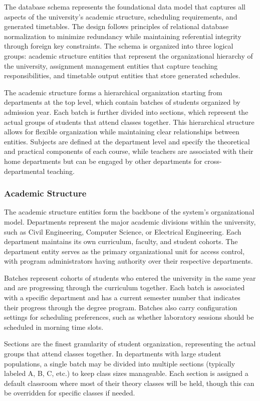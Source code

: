 \documentclass[12pt,a4paper]{article}
\begin{document}
The database schema represents the foundational data model that captures all aspects of the university's academic structure, scheduling requirements, and generated timetables. The design follows principles of relational database normalization to minimize redundancy while maintaining referential integrity through foreign key constraints. The schema is organized into three logical groups: academic structure entities that represent the organizational hierarchy of the university, assignment management entities that capture teaching responsibilities, and timetable output entities that store generated schedules.

The academic structure forms a hierarchical organization starting from departments at the top level, which contain batches of students organized by admission year. Each batch is further divided into sections, which represent the actual groups of students that attend classes together. This hierarchical structure allows for flexible organization while maintaining clear relationships between entities. Subjects are defined at the department level and specify the theoretical and practical components of each course, while teachers are associated with their home departments but can be engaged by other departments for cross-departmental teaching.

\subsubsection{Academic Structure}

The academic structure entities form the backbone of the system's organizational model. Departments represent the major academic divisions within the university, such as Civil Engineering, Computer Science, or Electrical Engineering. Each department maintains its own curriculum, faculty, and student cohorts. The department entity serves as the primary organizational unit for access control, with program administrators having authority over their respective departments.

Batches represent cohorts of students who entered the university in the same year and are progressing through the curriculum together. Each batch is associated with a specific department and has a current semester number that indicates their progress through the degree program. Batches also carry configuration settings for scheduling preferences, such as whether laboratory sessions should be scheduled in morning time slots.

Sections are the finest granularity of student organization, representing the actual groups that attend classes together. In departments with large student populations, a single batch may be divided into multiple sections (typically labeled A, B, C, etc.) to keep class sizes manageable. Each section is assigned a default classroom where most of their theory classes will be held, though this can be overridden for specific classes if needed.
\end{document}
